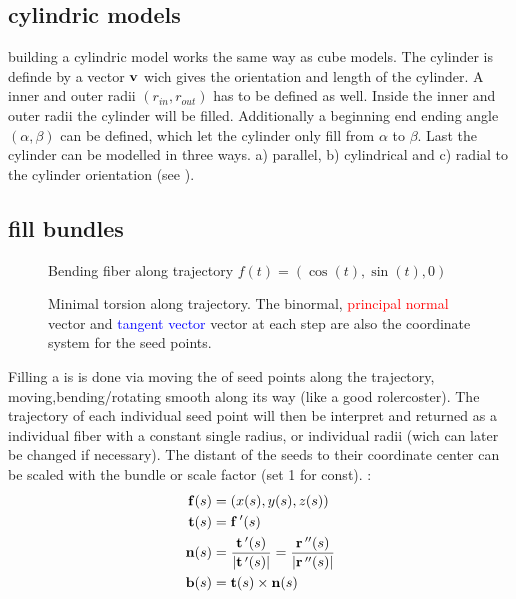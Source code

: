 \subsection{cylindric models}
% 
building a cylindric model works the same way as cube models.
The cylinder is definde by a vector $\mathbf{v}$ wich gives the orientation and length of the cylinder.
A inner and outer radii $(r_{\mathit{in}}, r_{\mathit{out}})$ has to be defined as well.
Inside the inner and outer radii the cylinder will be filled.
Additionally a beginning end ending angle $(\alpha, \beta)$ can be defined, which let the cylinder only fill from $\alpha$ to $\beta$.
Last the cylinder can be modelled in three ways. a) parallel, b) cylindrical and c) radial to the cylinder orientation (see \dummy).
% 
\subsection{fill bundles}\label{sec:fillBundle}
% 
\begin{figure}[!t]
    \centering
	\caption[]{Bending fiber along trajectory $f(t) = \left( \cos(t), \sin(t), 0 \right)$}
	\label{fig:circleBundle}
\end{figure}
% 
\begin{figure}[!t]
    \def\tikzheight{0.75\textwidth}
    \centering
	\caption[Minimal torsion trajectory]{Minimal torsion along trajectory. The \textcolor{green!50!black}{binormal}, \textcolor{red}{principal normal} vector and \textcolor{blue}{tangent vector} vector at each step are also the coordinate system for the seed points.}
\end{figure}
% 
Filling a  is is done via moving the  of seed points along the trajectory, moving,bending/rotating smooth along its way (like a good rolercoster).
The trajectory of each individual seed point will then be interpret and returned as a individual fiber with a constant single radius, or individual radii (wich can later be changed if necessary).
The distant of the seeds to their coordinate center can be scaled with the bundle  or scale factor (set 1 for const). :
% 
\begin{align}
\begin{split}
\mathbf{f}(s) &= (x(s),y(s),z(s)) \\
\mathbf{t}(s) &= \mathbf{f}\,'(s) \\
\mathbf{n}(s) &= \frac{\mathbf{t}\,'(s)}{|\mathbf{t}\,'(s)|} = \frac{\mathbf{r}\,''(s)}{|\mathbf{r}\,''(s)|} \\
\mathbf{b}(s) &= \mathbf{t}(s) \times \mathbf{n}(s)
\end{split}
\end{align}
% 
